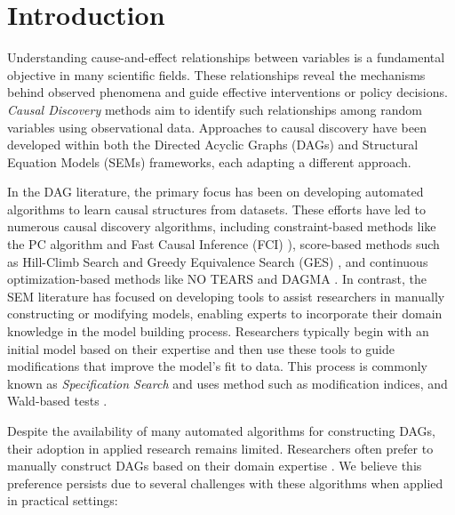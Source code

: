 \documentclass{uai2025} %
\begin{document}
\section{Introduction}
Understanding cause-and-effect relationships between variables is a fundamental
objective in many scientific fields. These relationships reveal the mechanisms
behind observed phenomena and guide effective interventions or policy
decisions. \emph{Causal Discovery} methods aim to identify such relationships
among random variables using observational data. Approaches to causal discovery
have been developed within both the Directed Acyclic Graphs (DAGs) and
Structural Equation Models (SEMs) frameworks, each adapting a different approach.

In the DAG literature, the primary focus has been on developing automated
algorithms to learn causal structures from datasets. These efforts have led to
numerous causal discovery algorithms, including constraint-based methods like
the PC algorithm \citep{Spirtes2001} and Fast Causal Inference (FCI)
\citep{Spirtes2000}), score-based methods such as Hill-Climb Search and Greedy
Equivalence Search (GES) \citep{Chickering2002}, and continuous
optimization-based methods like NO TEARS \citep{Zheng2018} and DAGMA
\citep{Bello2022}. In contrast, the SEM literature has focused on developing
tools to assist researchers in manually constructing or modifying models,
enabling experts to incorporate their domain knowledge in the model building
process. Researchers typically begin with an initial model based on their
expertise and then use these tools to guide modifications that improve the
model's fit to data. This process is commonly known as \emph{Specification
Search} \citep{Long1983} and uses method such as modification indices, and
Wald-based tests \citep{Marcoulides2018}.

Despite the availability of many automated algorithms for constructing DAGs,
their adoption in applied research remains limited. Researchers often prefer to
manually construct DAGs based on their domain expertise \citep{Tennant2020,
Petersen2021}. We believe this preference persists due to several challenges
with these algorithms when applied in practical settings:
\end{document}
